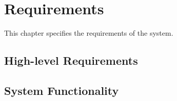 
\chapter{Requirements}
\label{chap:requirements}


This chapter specifies the requirements of the system.  


\section{High-level Requirements}
\label{sec:requirements}


\section{System Functionality}
\label{sec:systemfunction}


